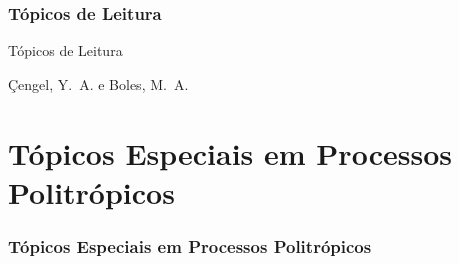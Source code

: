 \section{Tópicos de Leitura}

    \begin{frame}[allowframebreaks]{Tópicos de Leitura}
        \begin{thebibliography}{Çengel, Y.~A., 2013}
                Çengel, Y.~A. e Boles, M.~A.
        \end{thebibliography}
    \end{frame}


\part{Tópicos Especiais em Processos Politrópicos}

\section{Tópicos Especiais em Processos Politrópicos}

